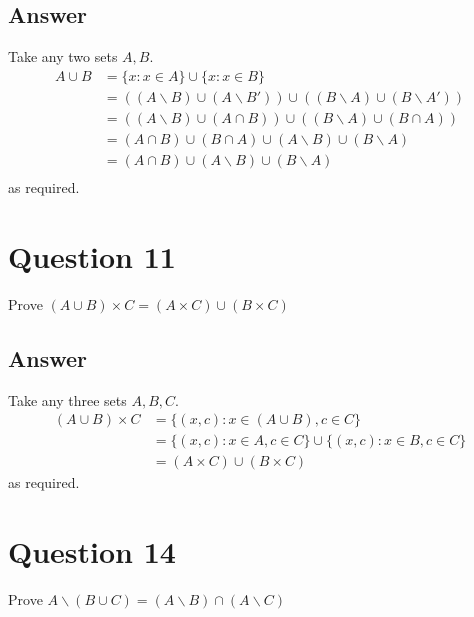 \documentclass[
	12pt, %
]{fphw}
\newcommand\set[1]{\{#1\}}
\newcommand\qed{\text{$\blacksquare$}}
\begin{document}

\subsection*{Answer}
 Take any two sets $A, B$.
\begin{align*}
A \cup B &= \set{x : x \in A} \cup \set{x : x \in B}\\
&=((A \backslash B) \cup (A \backslash B')) \cup ((B \backslash A) \cup (B \backslash A'))\\
&=((A \backslash B) \cup (A \cap B)) \cup ((B \backslash A) \cup (B \cap A))\\
&=(A \cap B) \cup (B \cap A) \cup (A \backslash B) \cup (B \backslash A)\\
&=(A \cap B) \cup (A \backslash B) \cup (B \backslash A)\\
\end{align*}
as required. \qed

\section*{Question 11}

\begin{problem}
Prove $(A \cup B) \times C = (A \times C) \cup (B \times C)$
\end{problem}


\subsection*{Answer}
 Take any three sets $A, B, C$.
\begin{align*}
(A \cup B) \times C &= \set{(x, c) : x \in (A \cup B), c \in C}\\
&= \set{(x, c) : x \in A, c \in C} \cup \set{(x, c) : x \in B, c \in C} \\
&=(A \times C) \cup (B \times C)
\end{align*}
as required. \qed

\section*{Question 14}

\begin{problem}
Prove $A \backslash (B \cup C) = (A \backslash B) \cap (A \backslash C)$
\end{problem}
\end{document}
